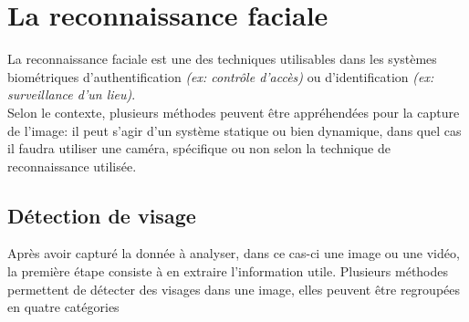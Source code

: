 \section{La reconnaissance faciale}
La reconnaissance faciale est une des techniques utilisables dans les systèmes biométriques d'authentification \textit{(ex: contrôle d'accès)} ou d'identification \textit{(ex: surveillance d'un lieu)}.
\\
Selon le contexte, plusieurs méthodes peuvent être appréhendées pour la capture de l'image: il peut s'agir d'un système statique ou bien dynamique, dans quel cas il faudra utiliser une caméra, spécifique ou non selon la technique de reconnaissance utilisée.

\subsection{Détection de visage}
Après avoir capturé la donnée à analyser, dans ce cas-ci une image ou une vidéo, la première étape consiste à en extraire l'information utile. Plusieurs méthodes permettent de détecter des visages dans une image, %
elles peuvent être regroupées en quatre catégories \cite{Xthesis_1}
